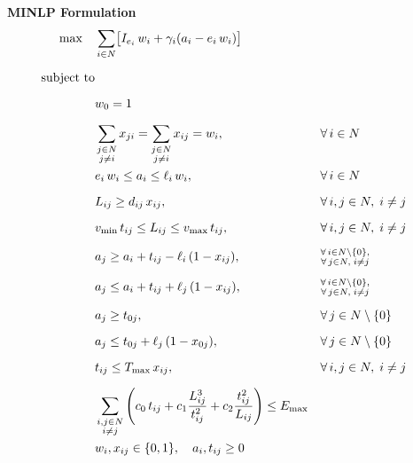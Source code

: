 \documentclass[11pt]{article}
\begin{document}
\vspace{6mm}


\noindent\textbf{MINLP Formulation}
\begin{align}
    \max \quad & \sum_{i \in N} \bigl[ I_{e_i}\, w_i + \gamma_i (a_i - e_i\, w_i) \bigr] \label{minlp:obj} \\[6pt]
    \text{subject to} \notag \\[6pt]
& w_0 = 1 \label{minlp:depot}\\[6pt]
& \sum_{\substack{j \in N \\ j \neq i}} x_{ji} = \sum_{\substack{j \in N \\ j \neq i}} x_{ij} = w_i,
    && \forall\, i \in N \label{minlp:eulerian}\\
& e_i\, w_i \le a_i \le \ell_i\, w_i,
    && \forall\, i \in N \label{minlp:tw} \\[6pt]
& L_{ij} \ge d_{ij}\, x_{ij},
    && \forall\, i,j \in N,\; i \neq j \label{minlp:flight-length} \\[6pt]
& v_{\min}\, t_{ij} \le L_{ij} \le v_{\max}\, t_{ij},
    && \forall\, i,j \in N,\; i \neq j \label{minlp:distance-bound} \\[6pt]
& a_j \ge a_i + t_{ij} - \ell_i\, (1 - x_{ij}),
    && \substack{\forall\, i \in N \setminus \{0\}, \\ \forall\, j \in N,\; i \neq j} \label{minlp:timelink} \\[6pt]
& a_j \le a_i + t_{ij} + \ell_j\, (1 - x_{ij}),
    && \substack{\forall\, i \in N \setminus \{0\}, \\ \forall\, j \in N,\; i \neq j} \label{minlp:timelink2} \\[6pt]
& a_j \ge t_{0j},
    && \forall\, j \in N \setminus \{0\} \label{minlp:timelink-depot} \\[6pt]
& a_j \le t_{0j} + \ell_j\, (1 - x_{0j}),
    && \forall\, j \in N \setminus \{0\} \label{minlp:timelink-depot2} \\[6pt]
& t_{ij} \leq T_{\max}\, x_{ij},
    && \forall\, i,j \in N,\; i \neq j \label{minlp:time-bound} \\[6pt]
& \sum_{\substack{i,j \in N \\ i \neq j}} \left( c_0\, t_{ij} + c_1 \frac{L_{ij}^3}{t_{ij}^2} + c_2 \frac{t_{ij}^2}{L_{ij}} \right) \le E_{\max} \label{minlp:energy} \\
& w_i, x_{ij} \in \{0,1\}, \quad a_{i}, t_{ij} \geq 0 \label{minlp:domain}
\end{align}
\end{document}
